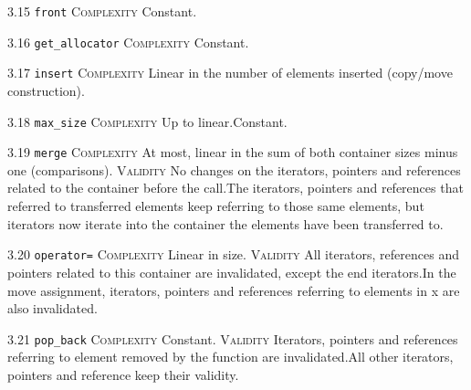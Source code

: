 \noindent\textcolor{cgreen}{3.15 \texttt{front}} \textsc{Complexity} Constant. \vspace{0.5em}

\noindent\textcolor{cgreen}{3.16 \texttt{get\_allocator}} \textsc{Complexity} Constant. \vspace{0.5em}

\noindent\textcolor{corange}{3.17 \texttt{insert}} \textsc{Complexity} Linear in the number of elements inserted (copy/move construction). \vspace{0.5em}

\noindent\textcolor{corange}{3.18 \texttt{max\_size}} \textsc{Complexity} Up to linear.Constant. \vspace{0.5em}

\noindent\textcolor{corange}{3.19 \texttt{merge}} \textsc{Complexity} At most, linear in the sum of both container sizes minus one (comparisons). \textsc{Validity} No changes on the iterators, pointers and references related to the container before the call.The iterators, pointers and references that referred to transferred elements keep referring to those same elements, but iterators now iterate into the container the elements have been transferred to.\vspace{0.5em}

\noindent\textcolor{corange}{3.20 \texttt{operator=}} \textsc{Complexity} Linear in size. \textsc{Validity} All iterators, references and pointers related to this container are invalidated, except the end iterators.In the move assignment, iterators, pointers and references referring to elements in x are also invalidated.\vspace{0.5em}

\noindent\textcolor{cgreen}{3.21 \texttt{pop\_back}} \textsc{Complexity} Constant. \textsc{Validity} Iterators, pointers and references referring to element removed by the function are invalidated.All other iterators, pointers and reference keep their validity.\vspace{0.5em}

